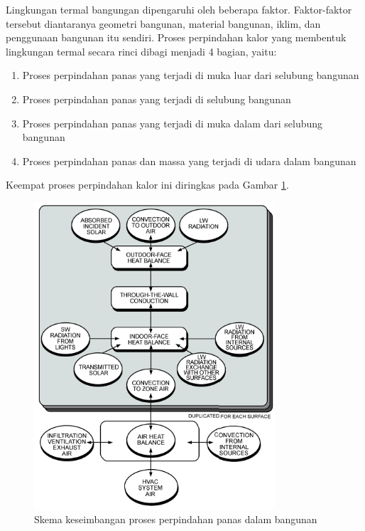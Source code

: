 Lingkungan termal bangungan dipengaruhi oleh beberapa faktor. Faktor-faktor tersebut diantaranya geometri bangunan, material bangunan, iklim, dan penggunaan bangunan itu sendiri. Proses perpindahan kalor yang membentuk lingkungan termal secara rinci dibagi menjadi 4 bagian, yaitu:

\begin{enumerate}
	\item Proses perpindahan panas yang terjadi di muka luar dari selubung bangunan
	\item Proses perpindahan panas yang terjadi di selubung bangunan
	\item Proses perpindahan panas yang terjadi di muka dalam dari selubung bangunan
	\item Proses perpindahan panas dan massa yang terjadi di udara dalam bangunan
\end{enumerate}

\noindent Keempat proses perpindahan kalor ini diringkas pada Gambar \ref{fig:3:HeatTransferScheme}.

\begin{figure}[!h]
	\centering
	\includegraphics[width=0.8\textwidth]{figures/HeatTransferScheme}
	\caption{Skema keseimbangan proses perpindahan panas dalam bangunan\cite{skripsiIchfan}}
	\label{fig:3:HeatTransferScheme}
\end{figure}

